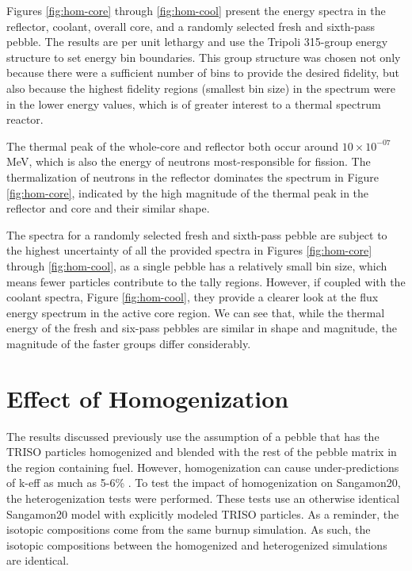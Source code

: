Figures \ref{fig:hom-core} through \ref{fig:hom-cool} present the energy spectra in the reflector, coolant, overall core, and a randomly selected fresh and sixth-pass pebble.  The results are per unit lethargy and use the Tripoli 315-group energy structure \cite{noauthor_tripoli_nodate} to set energy bin boundaries.  This group structure was chosen not only because there were a sufficient number of bins to provide the desired fidelity, but also because the highest fidelity regions (smallest bin size) in the spectrum were in the lower energy values, which is of greater interest to a thermal spectrum reactor.



The thermal peak of the whole-core and reflector both occur around $10\times10^{-07}$ MeV, which is also the energy of neutrons most-responsible for fission.  The thermalization of neutrons in the reflector dominates the spectrum in Figure \ref{fig:hom-core}, indicated by the high magnitude of the thermal peak in the reflector and core and their similar shape.



The spectra for a randomly selected fresh and sixth-pass pebble are subject to the highest uncertainty of all the provided spectra in Figures \ref{fig:hom-core} through \ref{fig:hom-cool}, as a single pebble has a relatively small bin size, which means fewer particles contribute to the tally regions.  However, if coupled with the coolant spectra, Figure \ref{fig:hom-cool}, they provide a clearer look at the flux energy spectrum in the active core region.  We can see that, while the thermal energy of the fresh and six-pass pebbles are similar in shape and magnitude, the magnitude of the faster groups differ considerably.


\section{Effect of Homogenization}
\label{res-hom}

The results discussed previously use the assumption of a pebble that has the TRISO particles homogenized and blended with the rest of the pebble matrix in the region containing fuel.  However, homogenization can cause under-predictions of k-eff as much as 5-6\% \cite{brown_stochastic_2005}.  To test the impact of homogenization on Sangamon20, the heterogenization tests were performed.  These tests use an otherwise identical Sangamon20 model with explicitly modeled TRISO particles.  As a reminder, the isotopic compositions come from the same burnup simulation.  As such, the isotopic compositions between the homogenized and heterogenized simulations are identical.


